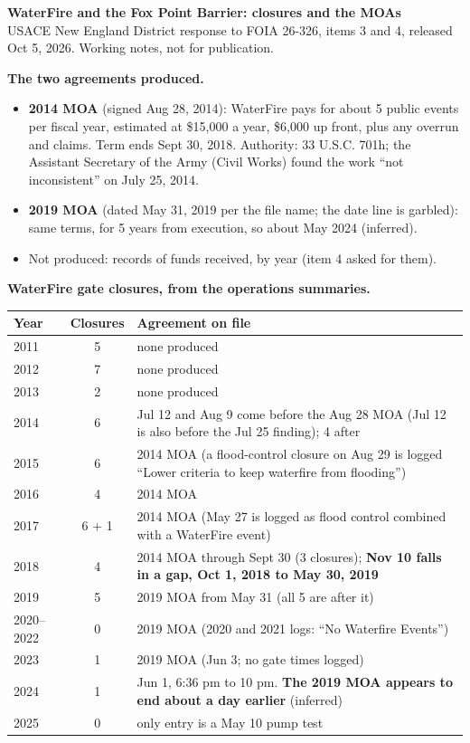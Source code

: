 \documentclass[10pt]{article}
\newcommand{\hl}[1]{\textbf{#1}}
\begin{document}
{\Large\bfseries WaterFire and the Fox Point Barrier: closures and the MOAs}\\[2pt]
{\small USACE New England District response to FOIA 26-326, items 3 and 4, released Oct 5, 2026. Working notes, not for publication.}

\vspace{4pt}
\hl{The two agreements produced.}
\begin{itemize}\setlength{\itemsep}{1pt}\setlength{\topsep}{2pt}
\item \hl{2014 MOA} (signed Aug 28, 2014): WaterFire pays for about 5 public events per fiscal year, estimated at \$15,000 a year, \$6,000 up front, plus any overrun and claims. Term ends Sept 30, 2018. Authority: 33 U.S.C. 701h; the Assistant Secretary of the Army (Civil Works) found the work ``not inconsistent'' on July 25, 2014.
\item \hl{2019 MOA} (dated May 31, 2019 per the file name; the date line is garbled): same terms, for 5 years from execution, so about May 2024 (inferred).
\item Not produced: records of funds received, by year (item 4 asked for them).
\end{itemize}

\hl{WaterFire gate closures, from the operations summaries.}

\vspace{2pt}
{\small
\begin{tabular}{@{}lcp{4.9in}@{}}
\toprule
Year & Closures & Agreement on file\\
\midrule
2011 & 5 & none produced\\
2012 & 7 & none produced\\
2013 & 2 & none produced\\
2014 & 6 & Jul 12 and Aug 9 come before the Aug 28 MOA (Jul 12 is also before the Jul 25 finding); 4 after\\
2015 & 6 & 2014 MOA (a flood-control closure on Aug 29 is logged ``Lower criteria to keep waterfire from flooding'')\\
2016 & 4 & 2014 MOA\\
2017 & 6 + 1 & 2014 MOA (May 27 is logged as flood control combined with a WaterFire event)\\
2018 & 4 & 2014 MOA through Sept 30 (3 closures); \hl{Nov 10 falls in a gap, Oct 1, 2018 to May 30, 2019}\\
2019 & 5 & 2019 MOA from May 31 (all 5 are after it)\\
2020--2022 & 0 & 2019 MOA (2020 and 2021 logs: ``No Waterfire Events'')\\
2023 & 1 & 2019 MOA (Jun 3; no gate times logged)\\
2024 & 1 & Jun 1, 6:36 pm to 10 pm. \hl{The 2019 MOA appears to end about a day earlier} (inferred)\\
2025 & 0 & only entry is a May 10 pump test\\
\bottomrule
\end{tabular}}
\end{document}
